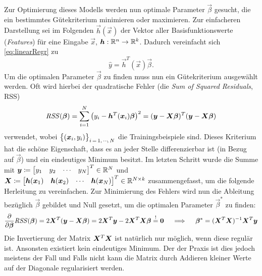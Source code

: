 		Zur Optimierung dieses Modells werden nun optimale Parameter \( \vec{\beta} \) gesucht, die ein bestimmtes Gütekriterium minimieren oder maximieren. Zur einfacheren Darstellung sei im Folgenden \( \vec{h}(\vec{x}) \) der Vektor aller Basisfunktionswerte (\emph{Features}) für eine Eingabe \(\vec{x}\), \dh \( \bm{h} : \mathbb{R}^n \to \mathbb{R}^k \). Dadurch vereinfacht sich \eqref{eq:linearRegr} zu
		\begin{equation}
			\hat{y} = \vec{h}^T(\vec{x}) \vec{\beta}.
		\end{equation}
		Um die optimalen Parameter \( \vec{\beta} \) zu finden muss nun ein Gütekriterium ausgewählt werden. Oft wird hierbei der quadratische Fehler (die \emph{Sum of Squared Residuals}, RSS)
		\begin{equation}
			\mathit{RSS}(\bm{\beta})
				= \sum_{i = 1}^{N} \big( y_i - \bm{h}^T(\bm{x}_i) \bm{\beta} \big)^2
				= (\bm{y} - \bm{X} \bm{\beta})^T (\bm{y} - \bm{X} \bm{\beta})
		\end{equation}
		verwendet, wobei \( \big\{ (\bm{x}_i, y_i) \big\}_{i \,=\, 1,\,\cdots\!,\,N} \) die Trainingsbeispiele sind. Dieses Kriterium hat die schöne Eigenschaft, dass es an jeder Stelle differenzierbar ist (in Bezug auf \(\vec{\beta}\)) und ein eindeutiges Minimum besitzt. Im letzten Schritt wurde die Summe mit \( \bm{y} \coloneqq \begin{bmatrix} y_1 & y_2 & \cdots & y_N \end{bmatrix}^T \in \mathbb{R}^N \) und \( \bm{X} \coloneqq \begin{bmatrix} \bm{h}(\bm{x}_1) & \bm{h}(\bm{x}_2) & \cdots & \bm{h}(\bm{x}_N) \end{bmatrix}^T \in \mathbb{R}^{N \times k} \) zusammengefasst, um die folgende Herleitung zu vereinfachen. Zur Minimierung des Fehlers wird nun die Ableitung bezüglich \(\vec{\beta}\) gebildet und Null gesetzt, um die optimalen Parameter \( \vec{\beta}^\ast \) zu finden:
		\begin{equation}
			\pdv{\bm{\beta}} \mathit{RSS}(\bm{\beta}) = 2 \bm{X}^T (\bm{y} - \bm{X} \bm{\beta}) = 2 \bm{X}^T \bm{y} - 2 \bm{X}^T \bm{X} \bm{\beta} \overset{!}{=} \bm{0}
			\quad\implies\quad
			\bm{\beta}^\ast = (\bm{X}^T \bm{X})^{-1} \bm{X}^T \bm{y}
		\end{equation}
		Die Invertierung der Matrix \( \bm{X}^T \bm{X} \) ist natürlich nur möglich, wenn diese regulär ist. Ansonsten existiert kein eindeutiges Minimum. Der der Praxis ist dies jedoch meistens der Fall und Falls nicht kann die Matrix durch Addieren kleiner Werte auf der Diagonale regularisiert werden.

